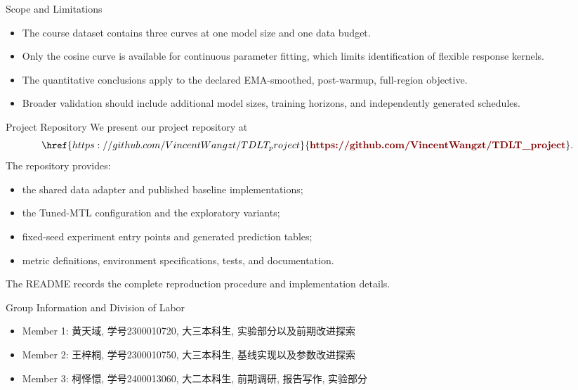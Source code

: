 \documentclass[aspectratio=169]{beamer}
\begin{document}
\begin{frame}{Scope and Limitations}
  \begin{itemize}
    \item The course dataset contains three curves at one model size and one data budget.
    \item Only the cosine curve is available for continuous parameter fitting, which limits identification of flexible response kernels.
    \item The quantitative conclusions apply to the declared EMA-smoothed, post-warmup, full-region objective.
    \item Broader validation should include additional model sizes, training horizons, and independently generated schedules.
  \end{itemize}
\end{frame}

\begin{frame}{Project Repository}
  We present our project repository at
  \[
    \href{https://github.com/VincentWangzt/TDLT_project}{\textcolor{baselinecolor}{\textbf{https://github.com/VincentWangzt/TDLT\_project}}}.
  \]
  The repository provides:
  \begin{itemize}
    \item the shared data adapter and published baseline implementations;
    \item the Tuned-MTL configuration and the exploratory variants;
    \item fixed-seed experiment entry points and generated prediction tables;
    \item metric definitions, environment specifications, tests, and documentation.
  \end{itemize}
  The README records the complete reproduction procedure and implementation details.
\end{frame}

\begin{frame}{Group Information and Division of Labor}
  \begin{itemize}
    \item Member 1: 黄天域, 学号2300010720, 大三本科生, 实验部分以及前期改进探索
    \item Member 2: 王梓桐, 学号2300010750, 大三本科生, 基线实现以及参数改进探索
    \item Member 3: 柯怿憬, 学号2400013060, 大二本科生, 前期调研, 报告写作, 实验部分
  \end{itemize}
\end{frame}
\end{document}
